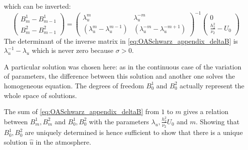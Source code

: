 which can be inverted:
\begin{equation}
	\label{eq:OASchwarz_appendix_deltaB}
	\begin{pmatrix}
B_m^1 - B_{m-1}^1\\
B_m^2 - B_{m-1}^2
	\end{pmatrix}
	=
	\begin{pmatrix}
		\lambda_u^m & \lambda_u^{-m} \\
		(\lambda_u^m - \lambda_u^{m-1})  & 
		(\lambda_u^{-m} - \lambda_u^{-m+1})
	\end{pmatrix}^{-1}
	\begin{pmatrix}
		0 \\ \frac{h_2^2}{\nu_2}-U_0
	\end{pmatrix}
\end{equation}
The determinant of the inverse matrix in
\eqref{eq:OASchwarz_appendix_deltaB} is
$\lambda_u^{-1} - \lambda_u$ which is never zero because
$\sigma > 0$.
\begin{remark}
	A particular solution was chosen here: as in the continuous case
	of the variation of parameters, the difference between this
	solution and another one solves the homogeneous equation.
	The degrees of freedom $B_0^1$ and $B_0^2$ actually represent
	the whole space of solutions.
\end{remark}
\par
The sum of \eqref{eq:OASchwarz_appendix_deltaB} from $1$ to $m$
gives a relation between $B^1_m, B^2_m$ and
$B^1_0, B^2_0$ with the parameters $\lambda_u, \frac{h_2^2}{\nu_2}U_0$ and $m$.
Showing that $B^1_0, B^2_0$ are uniquely determined is hence
sufficient to show that there is a unique solution $\widehat{u}$
in the atmosphere.

